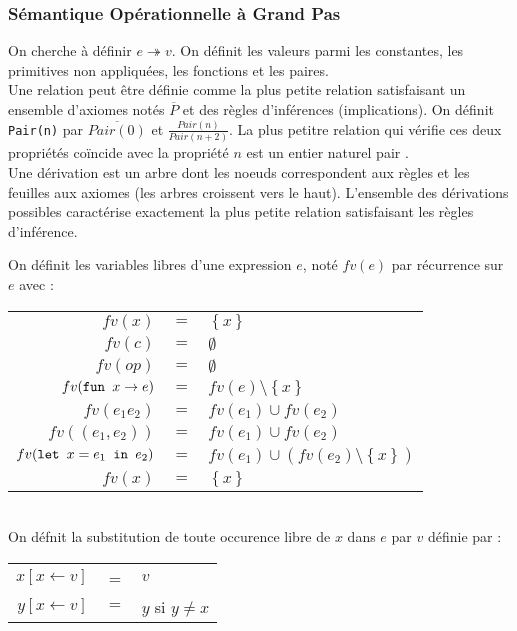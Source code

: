 \documentclass{cours}
\begin{document}
\subsubsection{Sémantique Opérationnelle à Grand Pas}
On cherche à définir $e \twoheadrightarrow v$. On définit les valeurs parmi les constantes, les primitives non appliquées, les fonctions et les paires. \\
Une relation peut être définie comme la plus petite relation satisfaisant un ensemble d'axiomes notés $\overline{P}$ et des règles d'inférences (implications). On définit \texttt{Pair(n)} par $\overline{Pair(0)}$ et $\frac{Pair(n)}{Pair(n+2)}$. La plus petitre relation qui vérifie ces deux propriétés coïncide avec la propriété \og $n$ est un entier naturel pair \fg.\\
Une dérivation est un arbre dont les noeuds correspondent aux règles et les feuilles aux axiomes (les arbres croissent vers le haut). L'ensemble des dérivations possibles caractérise exactement la plus petite relation satisfaisant les règles d'inférence. \\
\begin{definition}
    On définit les variables libres d'une expression $e$, noté $fv(e)$ par récurrence sur $e$ avec :
    \begin{tabular}{rcl}
        $fv(x)$                       & $=$ & $\left\{x\right\}$                                                \\
        $fv(c)$                       & $=$ & $\emptyset$                                                       \\
        $fv(op)$                      & $=$ & $\emptyset$                                                       \\
        $fv(\texttt{fun } x \rightarrow e)$              & $=$ & $fv(e) \setminus \left\{x\right\}$                                \\
        $fv(e_{1} e_{2})$             & $=$ & $fv(e_{1}) \cup fv(e_{2})$                                        \\
        $fv((e_{1}, e_{2}))$          & $=$ & $fv(e_{1}) \cup fv(e_{2})$                                        \\
        $fv(\texttt{let } x = e_{1} \texttt{ in } e_{2})$ & $=$ & $fv(e_{1}) \cup \left(fv(e_{2})\setminus \left\{x\right\}\right)$ \\
        $fv(x)$                       & $=$ & $\left\{x\right\}$                                                \\
    \end{tabular}\\
    On défnit la substitution  de toute occurence libre de $x$ dans $e$ par $v$ définie par :
    \begin{tabular}{rcl}
        $x[x\leftarrow v]$  & =   & $v$              \\
        $y[x \leftarrow v]$ & $=$ & $y$ si $y\neq x$
    \end{tabular}
\end{definition}
\end{document}
